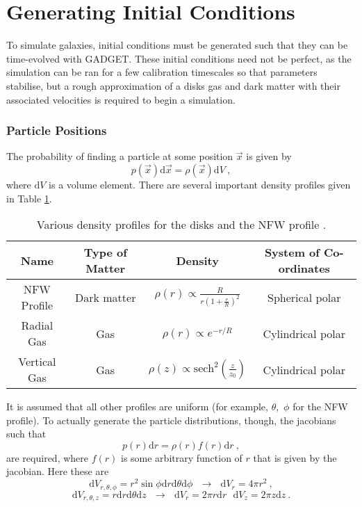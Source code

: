 \section{Generating Initial
Conditions}\label{app:gen}

To simulate galaxies, initial conditions must be generated such that they
can be time-evolved with GADGET. These initial conditions need not be
perfect, as the simulation can be ran for a few calibration timescales
so that parameters stabilise, but a rough approximation
of a disks gas and dark matter with their associated velocities is required to
begin a simulation.

\subsubsection{Particle Positions}

The probability of finding a particle at some position \(\vec{x}\) is
given by
\[
    p(\vec{x})\mathrm{d}\vec{x} = \rho(\vec{x})\mathrm{d}V~,
\]
where \(\mathrm{d}V\) is a volume element. There are several important
density profiles given in Table \ref{tab:profiles}.

\begin{table}
\centering
\begin{tabular}{c|c|c|c}
Name   &  Type of Matter  &    Density               & System of Co-ordinates \\ \hline
NFW Profile & Dark matter & $\rho(r) \propto \frac{R}{r\left(1 + \frac{r}{R}\right)^2}$ & Spherical polar \\
Radial Gas  & Gas & $\rho(r) \propto e^{-r/R}$ & Cylindrical polar \\
Vertical Gas & Gas & $\rho(z) \propto \mathrm{sech}^2\left(\frac{z}{z_0}\right)$ & Cylindrical polar \\
\end{tabular}
\caption{Various density profiles for the disks and the NFW profile \citep{ferriere_interstellar_2001, coe_dark_2010}.}
\label{tab:profiles}
\end{table}

It is assumed that all other profiles are uniform (for example,
\(\theta,\) \(\phi\) for the NFW profile). To actually generate the
particle distributions, though, the jacobians such that
\[
    p(r)\mathrm{d}r = \rho(r) f(r) \mathrm{d}r~,
\]
are required, where \(f(r)\) is some arbitrary function of \(r\) that is given by the
jacobian. Here these are
\[
    \mathrm{d}V_{r, \theta, \phi} = r^2\sin\phi\mathrm{d}r\mathrm{d}\theta\mathrm{d}\phi ~ ~ ~ \rightarrow ~ ~ ~ \mathrm{d}V_{r} = 4\pi r^2~,
\] \[
    \mathrm{d}V_{r, \theta, z} = r\mathrm{d}r\mathrm{d}\theta\mathrm{d}z ~ ~ ~ \rightarrow ~ ~ ~ \mathrm{d}V_{r} = 2\pi r \mathrm{d}r ~ ~ ~ \mathrm{d}V_z = 2\pi z \mathrm{d}z~.
\]

